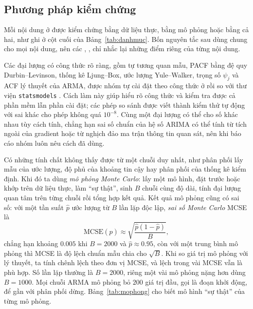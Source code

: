 

\subsection{Phương pháp kiểm chứng}

Mỗi nội dung ở  được kiểm chứng bằng dữ liệu thực, bằng mô phỏng hoặc bằng cả hai, như ghi ở cột cuối của Bảng~\ref{tab:danhmuc}. Bốn nguyên tắc sau dùng chung cho mọi nội dung, nên các , ,  chỉ nhắc lại những điểm riêng của từng nội dung.

Các đại lượng có công thức rõ ràng, gồm tự tương quan mẫu, PACF bằng đệ quy Durbin--Levinson, thống kê Ljung--Box, ước lượng Yule--Walker, trọng số $\psi_j$ và ACF lý thuyết của ARMA, được nhóm tự cài đặt theo công thức ở  rồi so với thư viện \texttt{statsmodels} . Cách làm này giúp hiểu rõ công thức và kiểm tra được cả phần mềm lẫn phần cài đặt; các phép so sánh được viết thành kiểm thử tự động với sai khác cho phép không quá $10^{-8}$. Cùng một đại lượng có thể cho số khác nhau tùy cách tính, chẳng hạn sai số chuẩn của hệ số ARIMA có thể tính từ tích ngoài của gradient hoặc từ nghịch đảo ma trận thông tin quan sát, nên khi báo cáo nhóm luôn nêu cách đã dùng.

Có những tính chất không thấy được từ một chuỗi duy nhất, như phân phối lấy mẫu của ước lượng, độ phủ của khoảng tin cậy hay phân phối của thống kê kiểm định. Khi đó ta dùng \emph{mô phỏng Monte Carlo}: lấy một mô hình, đặt trước hoặc khớp trên dữ liệu thực, làm ``sự thật'', sinh $B$ chuỗi cùng độ dài, tính đại lượng quan tâm trên từng chuỗi rồi tổng hợp kết quả. Kết quả mô phỏng cũng có sai số: với một tần suất $\hat p$ ước lượng từ $B$ lần lặp độc lập, \emph{sai số Monte Carlo} MCSE là
\[
\mathrm{MCSE}(\hat p)\approx\sqrt{\frac{\hat p(1-\hat p)}{B}},
\]
chẳng hạn khoảng $0.005$ khi $B=2000$ và $\hat p\approx0.95$, còn với một trung bình mô phỏng thì MCSE là độ lệch chuẩn mẫu chia cho $\sqrt B$. Khi so giá trị mô phỏng với lý thuyết, ta tính chênh lệch theo đơn vị MCSE, và lệch trong vài MCSE vẫn là phù hợp. Số lần lặp thường là $B=2000$, riêng một vài mô phỏng nặng hơn dùng $B=1000$. Mọi chuỗi ARMA mô phỏng bỏ $200$ giá trị đầu, gọi là đoạn khởi động, để gần với phân phối dừng. Bảng~\ref{tab:mophong} cho biết mô hình ``sự thật'' của từng mô phỏng.

